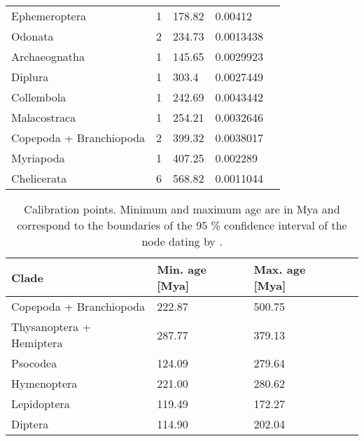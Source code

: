 \begin{table}
\begin{tabular}{@{}lllll@{}}
Ephemeroptera              & 1       & 178.82                    & 0.00412                       \\
Odonata                    & 2       & 234.73                    & 0.0013438                     \\
Archaeognatha              & 1       & 145.65                    & 0.0029923                     \\
Diplura                    & 1       & 303.4                     & 0.0027449                     \\
Collembola                 & 1       & 242.69                    & 0.0043442                     \\
Malacostraca               & 1       & 254.21                    & 0.0032646                     \\
Copepoda + Branchiopoda    & 2       & 399.32                    & 0.0038017                     \\
Myriapoda                  & 1       & 407.25                    & 0.002289                      \\
Chelicerata                & 6       & 568.82                    & 0.0011044                     \\ \bottomrule
\end{tabular}
\end{table}

\begin{table}[]
\centering
\caption[Branch length calibration points from \citet{Misof2014}]{Calibration points. Minimum and maximum age are in Mya and correspond to the boundaries of the 95 \% confidence interval of the node dating by \citet{Misof2014}.}
\label{tab:calibration-points}
\begin{tabular}{@{}llll@{}}
\toprule
Clade                     & Min. age [Mya]  & Max. age [Mya] \\ 
\midrule
Copepoda + Branchiopoda   & 222.87          & 500.75         \\
Thysanoptera + Hemiptera  & 287.77          & 379.13         \\
Psocodea                  & 124.09          & 279.64         \\ 
Hymenoptera               & 221.00          & 280.62         \\
Lepidoptera               & 119.49          & 172.27         \\
Diptera                   & 114.90          & 202.04         \\
\bottomrule
\end{tabular}
\end{table}


